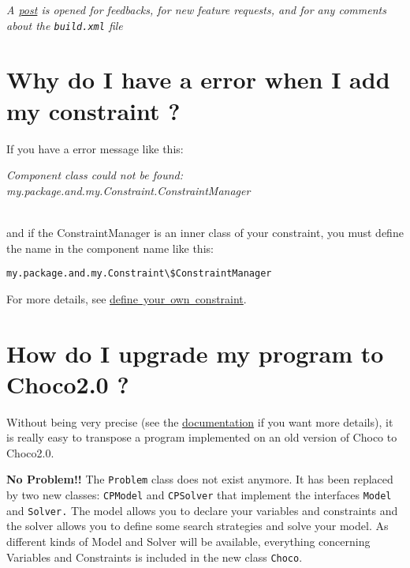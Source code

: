 \emph{A \href{http://www.emn.fr/x-info/choco-solver/forum/viewtopic.phpf=5&t=4&start=0&st=0&sk=t&sd=a}{post} is opened for feedbacks, for new feature requests, and for any comments about the \texttt{build.xml} file}

\section{Why do I have a error when I add my constraint ?}\label{faq:whydoihaveaerrorwheniaddmyconstraint}\hypertarget{faq:whydoihaveaerrorwheniaddmyconstraint}{}
If you have a error message like this:\\
\centerline{\emph{Component class could not be found: my.package.and.my.Constraint.ConstraintManager}}\\
and if the ConstraintManager is an inner class of your constraint, you must define the name in the component name like this:
\begin{lstlisting}
my.package.and.my.Constraint\$ConstraintManager
\end{lstlisting}

For more details, see \hyperlink{advanced:defineyourownconstraint}{define\ your\ own\ constraint}.

\section{How do I upgrade my program to Choco2.0 ?}\label{faq:howdoiupgrademyprogramtochoco2.0}\hypertarget{faq:howdoiupgrademyprogramtochoco2.0}{}
Without being very precise (see the \hyperlink{ch:doc}{documentation} if you want more details), it is really easy to transpose a program implemented on an old version of Choco to Choco2.0.

\textbf{No Problem!!} The \texttt{Problem} class does not exist anymore. It has been replaced by two new classes: \texttt{CPModel} and \texttt{CPSolver} that implement the interfaces \texttt{Model} and \texttt{Solver.} The model allows you to declare your variables and constraints and the solver allows you to define some search strategies and solve your model. As different kinds of Model and Solver will be available, everything concerning Variables and Constraints is included in the new class \texttt{Choco}. 

